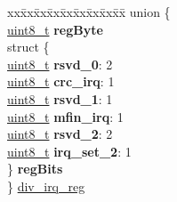 \begin{DoxyCompactItemize}
\begin{tabbing}
\end{tabbing}\item 
\begin{tabbing}
xx\=xx\=xx\=xx\=xx\=xx\=xx\=xx\=xx\=\kill
union \{\\
\>\hyperlink{vl53l0x__types_8h_aba7bc1797add20fe3efdf37ced1182c5}{uint8\_t} {\bfseries regByte}\\
\>struct \{\\
\>\>\hyperlink{vl53l0x__types_8h_aba7bc1797add20fe3efdf37ced1182c5}{uint8\_t} {\bfseries rsvd\_0}: 2\\
\>\>\hyperlink{vl53l0x__types_8h_aba7bc1797add20fe3efdf37ced1182c5}{uint8\_t} {\bfseries crc\_irq}: 1\\
\>\>\hyperlink{vl53l0x__types_8h_aba7bc1797add20fe3efdf37ced1182c5}{uint8\_t} {\bfseries rsvd\_1}: 1\\
\>\>\hyperlink{vl53l0x__types_8h_aba7bc1797add20fe3efdf37ced1182c5}{uint8\_t} {\bfseries mfin\_irq}: 1\\
\>\>\hyperlink{vl53l0x__types_8h_aba7bc1797add20fe3efdf37ced1182c5}{uint8\_t} {\bfseries rsvd\_2}: 2\\
\>\>\hyperlink{vl53l0x__types_8h_aba7bc1797add20fe3efdf37ced1182c5}{uint8\_t} {\bfseries irq\_set\_2}: 1\\
\>\} {\bfseries regBits}\\
\} \hyperlink{structstruct_afe48e85a7251b6182a5f8a6be7344d5f}{div\_irq\_reg}\\


\end{tabbing}
\end{DoxyCompactItemize}
